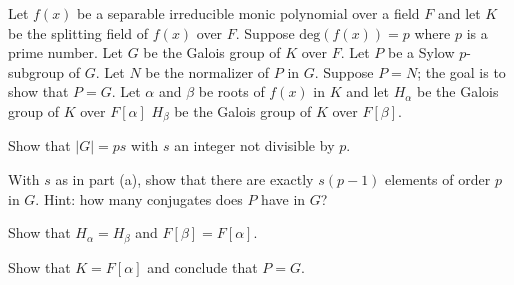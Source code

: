 Let $f(x)$ be a separable irreducible monic polynomial over a field
$F$ and let $K$ be the splitting field of $f(x)$ over $F$. Suppose
$\mathrm{deg}(f(x))=p$ where $p$ is a prime number. Let $G$ be the
Galois group of $K$ over $F$. Let $P$ be a Sylow $p$-subgroup of
$G$. Let $N$ be the normalizer of $P$ in $G$. Suppose $P=N$; the goal
is to show that $P=G$. Let $\alpha$ and $\beta$ be roots of $f(x)$ in
$K$ and let $H_{\alpha}$ be the Galois group of $K$ over $F[\alpha]$
 $H_{\beta}$ be the Galois group of $K$ over $F[\beta]$.
\begin{alist}
\item Show that $|G|=ps$ with $s$ an integer not divisible by $p$.
\item With $s$ as in part (a), show that there are exactly $s(p-1)$
elements of order $p$ in $G$. Hint: how many conjugates does $P$ have
in $G$?
\item  Show that $H_{\alpha}=H_{\beta}$ and $F[\beta]=F[\alpha]$. 
\item Show that $K=F[\alpha]$ and conclude that $P=G$.
\end{alist}
